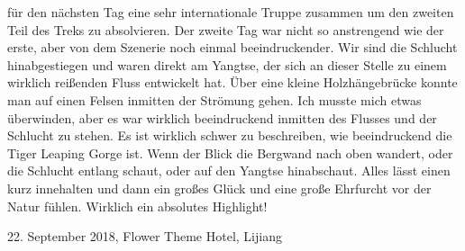 \documentclass[11pt]{book}
\begin{document}
für den nächsten Tag eine sehr internationale Truppe zusammen um den zweiten Teil des Treks zu absolvieren. 
Der zweite Tag war nicht so anstrengend wie der erste, aber von dem Szenerie noch einmal beeindruckender. Wir 
sind die Schlucht hinabgestiegen und waren direkt am Yangtse, der sich an dieser Stelle zu einem wirklich reißenden 
Fluss entwickelt hat. Über eine kleine Holzhängebrücke konnte man auf einen Felsen inmitten der Strömung gehen.
Ich musste mich etwas überwinden, aber es war wirklich beeindruckend inmitten des Flusses und der Schlucht zu stehen.
Es ist wirklich schwer zu beschreiben, wie beeindruckend die Tiger Leaping Gorge ist. Wenn der Blick die Bergwand 
nach oben wandert, oder die Schlucht entlang schaut, oder auf den Yangtse hinabschaut. Alles lässt einen kurz innehalten 
und dann ein großes Glück und eine große Ehrfurcht vor der Natur fühlen. Wirklich ein absolutes Highlight!

22. September 2018, Flower Theme Hotel, Lijiang
\end{document}
